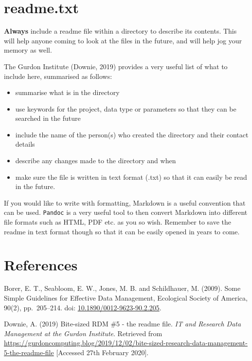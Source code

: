 \documentclass[12pt,a4paper,oneside]{report}
\providecommand{\tightlist}{%
  \setlength{\itemsep}{0pt}\setlength{\parskip}{0pt}}
\begin{document}
\hypertarget{readme.txt}{%
\section{readme.txt}\label{readme.txt}}

\textbf{Always} include a readme file within a directory to describe its
contents. This will help anyone coming to look at the files in the
future, and will help jog your memory as well.

The Gurdon Institute (Downie, 2019) provides a very useful list of what
to include here, summarised as follows:

\begin{itemize}
\tightlist
\item
  summarise what is in the directory
\item
  use keywords for the project, data type or parameters so that they can
  be searched in the future
\item
  include the name of the person(s) who created the directory and their
  contact details
\item
  describe any changes made to the directory and when
\item
  make sure the file is written in text format (.txt) so that it can
  easily be read in the future.
\end{itemize}

If you would like to write with formatting, Markdown is a useful
convention that can be used. \texttt{Pandoc} is a very useful tool to
then convert Markdown into different file formats such as HTML, PDF etc.
as you so wish. Remember to save the readme in text format though so
that it can be easily opened in years to come.

\hypertarget{references-1}{%
\section{References}\label{references-1}}

Borer, E. T., Seabloom, E. W., Jones, M. B. and Schildhauer, M. (2009).
Some Simple Guidelines for Effective Data Management, Ecological Society
of America, 90(2), pp.~205--214. doi:
\href{https://doi.org/10.1890/0012-9623-90.2.205}{10.1890/0012-9623-90.2.205}.

Downie, A. (2019) Bite-sized RDM \#5 - the readme file. \emph{IT and
Research Data Management at the Gurdon Institute}. Retrieved from
\href{https://gurdoncomputing.blog/2019/12/02/bite-sized-research-data-management-5-the-readme-file/}{https://gurdoncomputing.blog/2019/12/02/bite-sized-research-data-management-5-the-readme-file}
{[}Accessed 27th February 2020{]}.
\end{document}
